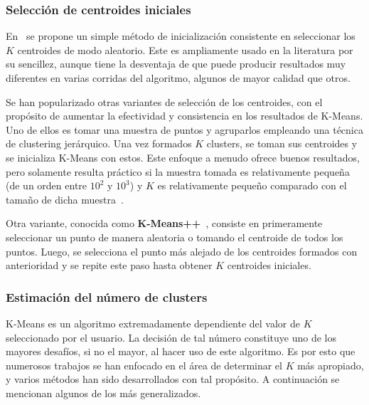 \subsubsection{Selección de centroides iniciales}

En~\cite{MacQueen67} se propone un simple método de inicialización consistente en seleccionar los $K$ centroides de modo aleatorio.
Este es ampliamente usado en la literatura por su sencillez, aunque tiene la desventaja de que puede producir resultados muy diferentes en varias corridas del algoritmo, algunos de mayor calidad que otros.

Se han popularizado otras variantes de selección de los centroides, con el propósito de aumentar la efectividad y consistencia en los resultados de K-Means.
Uno de ellos es tomar una muestra de puntos y agruparlos empleando una técnica de clustering jerárquico.
Una vez formados $K$ clusters, se toman sus centroides y se inicializa K-Means con estos.
Este enfoque a menudo ofrece buenos resultados, pero solamente resulta práctico si la muestra tomada es relativamente pequeña (de un orden entre $10^2$ y $10^3$) y $K$ es relativamente pequeño comparado con el tamaño de dicha muestra~\cite{Tan05}.

Otra variante, conocida como \textbf{K-Means++}~\cite{Arthur07}, consiste en primeramente seleccionar un punto de manera aleatoria o tomando el centroide de todos los puntos.
Luego, se selecciona el punto más alejado de los centroides formados con anterioridad y se repite este paso hasta obtener $K$ centroides iniciales.

\subsubsection{Estimación del número de clusters}

K-Means es un algoritmo extremadamente dependiente del valor de $K$ seleccionado por el usuario.
La decisión de tal número constituye uno de los mayores desafíos, si no el mayor, al hacer uso de este algoritmo.
Es por esto que numerosos trabajos se han enfocado en el área de determinar el $K$ más apropiado, y varios métodos han sido desarrollados con tal propósito.
A continuación se mencionan algunos de los más generalizados.

